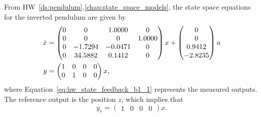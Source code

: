 
From HW~\ref{ds:pendulum}.\ref{chap:state_space_models}, the state space equations for the inverted pendulum are given by
\begin{align}
\dot{x} &= \begin{pmatrix}
       0 &        0 &   1.0000 &        0 \\
       0 &        0 &        0 &   1.0000 \\
       0 &  -1.7294 &   -0.0471 &        0 \\
       0 &  34.5882 &   0.1412 &        0 \\
\end{pmatrix} x + \begin{pmatrix}
     0 \\
     0 \\
0.9412 \\
-2.8235 \\
\end{pmatrix} u \notag \\
y &= \begin{pmatrix}
1 & 0 & 0 & 0 \\
0 & 1 & 0 & 0 
\end{pmatrix} x, \label{eq:hw_state_feedback_b1_1}
\end{align}
where Equation~\eqref{eq:hw_state_feedback_b1_1} represents the measured outputs.  The reference output is the position $z$, which implies that
\[
y_r = \begin{pmatrix} 1 & 0 & 0 & 0 \end{pmatrix} x.
\]
